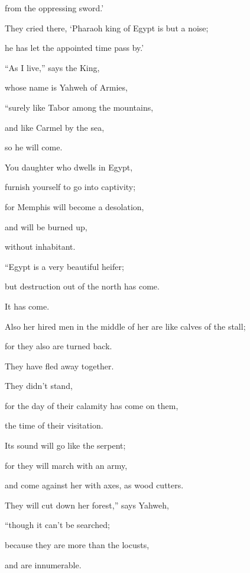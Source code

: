 {\par }{\QB from the oppressing sword.’
\par }{\Q {}They cried there, ‘Pharaoh king of Egypt is but a noise;
\par }{\QB he has let the appointed time pass by.’
\par }{\BB \par }{\Q {}“As I live,” says the King,
\par }{\QB whose name is Yahweh of Armies,
\par }{\Q “surely like Tabor among the mountains,
\par }{\QB and like Carmel by the sea,
\par }{\QB so he will come.
\par }{\Q {}You daughter who dwells in Egypt,
\par }{\QB furnish yourself to go into captivity;
\par }{\Q for Memphis will become a desolation,
\par }{\QB and will be burned up,
\par }{\QB without inhabitant.
\par }{\BB \par }{\Q {}“Egypt is a very beautiful heifer;
\par }{\QB but destruction out of the north has come.
\par }{\QB It has come.
\par }{\Q {}Also her hired men in the middle of her are like calves of the stall;
\par }{\QB for they also are turned back.
\par }{\QB They have fled away together.
\par }{\Q They didn’t stand,
\par }{\QB for the day of their calamity has come on them,
\par }{\QB the time of their visitation.
\par }{\Q {}Its sound will go like the serpent;
\par }{\QB for they will march with an army,
\par }{\QB and come against her with axes, as wood cutters.
\par }{\Q {}They will cut down her forest,” says Yahweh,
\par }{\QB “though it can’t be searched;
\par }{\Q because they are more than the locusts,
\par }{\QB and are innumerable.
}
